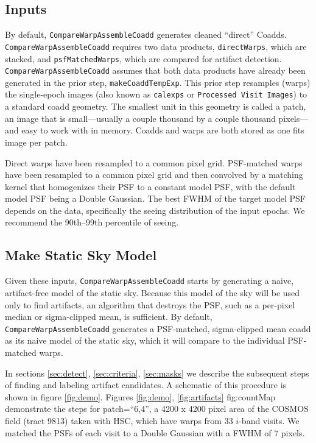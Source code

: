 \documentclass[DM,authoryear,toc]{lsstdoc}
\begin{document}
\subsection{Inputs}

By default, \texttt{CompareWarpAssembleCoadd} generates cleaned ``direct'' Coadds.
\texttt{CompareWarpAssembleCoadd} requires two data products, \texttt{directWarps}, which are stacked, and \texttt{psfMatchedWarps}, which are compared for artifact detection.
\texttt{CompareWarpAssembleCoadd}  assumes that both data products have already been generated in the prior step, \texttt{makeCoaddTempExp}.
This prior step resamples (warps) the single-epoch images (also known as \texttt{calexps} or \texttt{Processed Visit Images}) to a standard coadd geometry.
The smallest unit in this geometry is called a patch, an image that is small---usually a couple thousand by a couple thousand pixels---and easy to work with in memory.
Coadds and warps are both stored as one fits image per patch.

Direct warps have been resampled to a common pixel grid.
PSF-matched warps have been resampled to a common pixel grid and then convolved by a matching kernel that homogenizes their PSF to a constant model PSF, with the default model PSF being a Double Gaussian.
The best FWHM of the target model PSF depends on the data, specifically the seeing distribution of the input epochs.
We recommend the 90th--99th percentile of seeing.

\subsection{Make Static Sky Model}

Given these inputs, \texttt{CompareWarpAssembleCoadd} starts by generating a naive, artifact-free model of the static sky.
Because this model of the sky will be used only to find artifacts, an algorithm that destroys the PSF, such as a per-pixel median or sigma-clipped mean, is sufficient.
By default, \texttt{CompareWarpAssembleCoadd} generates a PSF-matched, sigma-clipped mean coadd as its naive model of the static sky, which it will compare to the individual PSF-matched warps.


In sections \ref{sec:detect}, \ref{sec:criteria}, \ref{sec:masks} we describe the subsequent steps of finding and labeling artifact candidates.
A schematic of this procedure is shown in figure \ref{fig:demo}.
Figures \ref{fig:demo}, \ref{fig:artifacts} {fig:countMap} demonstrate the steps for patch=``6,4'', a 4200 x 4200 pixel area of the COSMOS field (tract 9813) taken with HSC, which have warps from 33 $i$-band visits.
We matched the PSFs of each visit to a Double Gaussian with a FWHM of 7 pixels.
\end{document}

